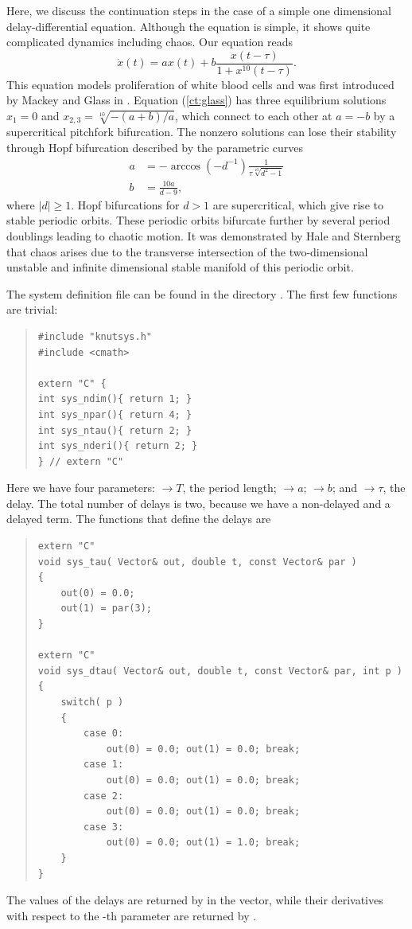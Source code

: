 \documentclass[10pt,a4paper]{ddedoc}
\begin{document}
Here, we discuss the continuation steps in the case of a simple one dimensional
delay-differential equation. Although the equation is simple, it shows quite
complicated dynamics including chaos. Our equation reads
\begin{equation}
  \dot{x} ( t ) = ax ( t ) + b \frac{x ( t - \tau )}{1 + x^{10} ( t - \tau )}.
\label{ct:glass}
\end{equation}
This equation models proliferation of white blood cells and was first
introduced by Mackey and Glass in {\cite{mackey}}. Equation (\ref{ct:glass})
has three equilibrium solutions $x_1 = 0$ and $x_{2, 3} = \sqrt[10]{- ( a + b
) / a}$, which connect to each other at $a = - b$ by a supercritical pitchfork
bifurcation. The nonzero solutions can lose their stability through Hopf
bifurcation described by the parametric curves
\begin{align*}
  a & =-\arccos(-d^{-1}){\frac{1}{{\tau} {\sqrt[10]{d^2-1}}}}\\
  b & ={\frac{10a}{d-9}},
\end{align*}
where $|d| \ge 1$. Hopf bifurcations for $d > 1$ are supercritical, which give
rise to stable periodic orbits. These periodic orbits bifurcate further by
several period doublings leading to chaotic motion. It was demonstrated by
Hale and Sternberg {\cite{sternberg}} that chaos arises due to the transverse
intersection of the two-dimensional unstable and infinite dimensional stable
manifold of this periodic orbit.

The system definition file can be found in the directory
. The first few functions are trivial:
{ \small \begin{quote} \begin{lstlisting}[frame=single]
#include "knutsys.h"
#include <cmath>

extern "C" {
int sys_ndim(){ return 1; }
int sys_npar(){ return 4; }
int sys_ntau(){ return 2; }
int sys_nderi(){ return 2; }
} // extern "C"
\end{lstlisting} \end{quote} } \noindent
Here we have four parameters:
$\to T$, the period length;
$\to a$;
$\to b$; and
$\to \tau$, the delay.
The total number of delays is two, because we have a non-delayed and a delayed
term.
The functions that define the delays are
{ \small \begin{quote} \begin{lstlisting}[frame=single]
extern "C"
void sys_tau( Vector& out, double t, const Vector& par ) 
{
	out(0) = 0.0;
	out(1) = par(3);
}

extern "C"
void sys_dtau( Vector& out, double t, const Vector& par, int p ) 
{
	switch( p )
	{
		case 0:
			out(0) = 0.0; out(1) = 0.0; break;
		case 1:
			out(0) = 0.0; out(1) = 0.0; break;
		case 2:
			out(0) = 0.0; out(1) = 0.0; break;
		case 3:
			out(0) = 0.0; out(1) = 1.0; break;
	}
}
\end{lstlisting} \end{quote} } \noindent
The values of the delays are returned by  in the 
vector, while their derivatives with respect to the -th parameter are
returned by .
\end{document}

